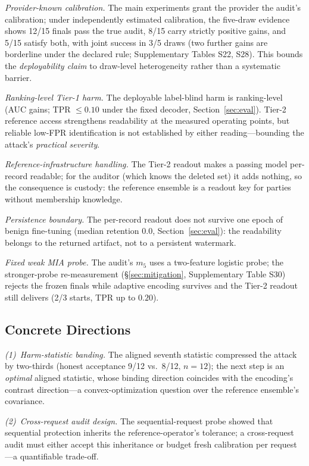 \documentclass[lettersize,journal]{IEEEtran}
\begin{document}
\emph{Provider-known calibration.} The main experiments
grant the provider the audit's calibration; under
independently estimated calibration, the five-draw evidence
shows 12/15 finals pass the true audit, 8/15 carry strictly
positive gains, and 5/15 satisfy both, with joint success in
3/5 draws (two further gains are borderline under the
declared rule; Supplementary Tables S22, S28). This bounds the
\emph{deployability claim} to draw-level heterogeneity
rather than a systematic barrier.

\emph{Ranking-level Tier-1 harm.} The deployable label-blind
harm is ranking-level (AUC gains; TPR $\le 0.10$ under the
fixed decoder, Section~\ref{sec:eval}). Tier-2 reference
access strengthens readability at the measured operating
points, but reliable low-FPR identification is not established
by either reading---bounding the attack's \emph{practical
severity}.

\emph{Reference-infrastructure handling.} The Tier-2 readout
makes a passing model per-record readable; for the auditor
(which knows the deleted set) it adds nothing, so the
consequence is custody: the reference ensemble is a readout
key for parties without membership knowledge.

\emph{Persistence boundary.} The per-record readout does not
survive one epoch of benign fine-tuning (median retention
$0.0$, Section~\ref{sec:eval}): the readability belongs to
the returned artifact, not to a persistent watermark.

\emph{Fixed weak MIA probe.} The audit's $m_5$ uses a
two-feature logistic probe; the stronger-probe
re-measurement (\S\ref{sec:mitigation}, Supplementary
Table S30) rejects the frozen finals while adaptive encoding
survives and the Tier-2 readout still delivers (2/3 starts,
TPR up to $0.20$).

\subsection{Concrete Directions}\label{sec:open}
\emph{(1)~Harm-statistic banding.} The aligned seventh
statistic compressed the attack by two-thirds (honest
acceptance 9/12 vs.\ 8/12, $n{=}12$); the next step is an
\emph{optimal} aligned statistic, whose binding direction
coincides with the encoding's contrast
direction---a convex-optimization question over the reference
ensemble's covariance.

\emph{(2)~Cross-request audit design.} The sequential-request
probe showed that sequential protection inherits the
reference-operator's tolerance; a cross-request audit must
either accept this inheritance or budget fresh calibration
per request---a quantifiable trade-off.
\end{document}

